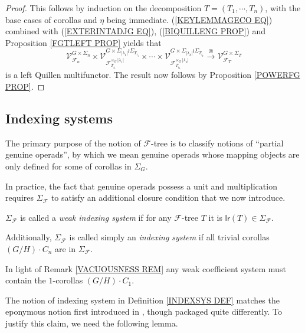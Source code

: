 \documentclass[a4paper,10pt]{article}%
\begin{document}
\begin{proof}
	This follows by induction on the decomposition 
	$T=(T_1,\cdots,T_n)$, with the base cases of corollas and $\eta$ being immediate. (\ref{KEYLEMMAGECO EQ}) combined with (\ref{EXTERINTADJG EQ}), (\ref{BIQUILLENG PROP}) and Proposition \ref{FGTLEFT PROP} yields that
\[
	\mathcal{V}^{G \times \Sigma_n}_{\mathcal{F}_n}	
		\times
	\mathcal{V}
	^{G \times \Sigma_{|\lambda_1|}\wr \Sigma_{T_{i_1}}}
	_{\mathcal{F}_{T_{i_1}}^{\ltimes_G |\lambda_1|}}
		\times \cdots \times
	\mathcal{V}
	^{G \times \Sigma_{|\lambda_k|}\wr \Sigma_{T_{i_k}}}
	_{\mathcal{F}_{T_{i_k}}^{\ltimes_G |\lambda_k|}}
		\xrightarrow{\otimes}
	\mathcal{V}^{G \times \Sigma_T}_{\mathcal{F}_T}
\]
is a left Quillen multifunctor.
The result now follows by Proposition \ref{POWERFG PROP}. 
\end{proof}




\subsection{Indexing systems}


The primary purpose of the notion of $\mathcal{F}$-tree is to classify notions of ``partial genuine operads'', by which we mean genuine operads whose mapping objects are only defined for some of corollas in 
$\Sigma_G$.

In practice, the fact that genuine operads possess a unit and multiplication requires $\Sigma_{\mathcal{F}}$ to satisfy an additional closure condition that we now introduce.

\begin{definition}\label{INDEXSYS DEF}
	$\Sigma_{\mathcal{F}}$ is called a 
	\textit{weak indexing system}
	if for any $\mathcal{F}$-tree $T$ it is 
	$\mathsf{lr}(T) \in \Sigma_{\mathcal{F}}$.
	
	Additionally, $\Sigma_{\mathcal{F}}$ is called simply an \textit{indexing system} if all trivial corollas 
$(G/H)\cdot C_n$ are in $\Sigma_{\mathcal{F}}$.
\end{definition}


\begin{remark}
	In light of Remark \ref{VACUOUSNESS REM} any weak coefficient system must contain the $1$-corollas $(G/H) \cdot C_1$.
\end{remark}

The notion of indexing system in Definition \ref{INDEXSYS DEF} matches the eponymous notion first introduced in 
\cite[Def. 3.22]{BH15}, though packaged quite differently.
To justify this claim, we need the following lemma.
\end{document}
